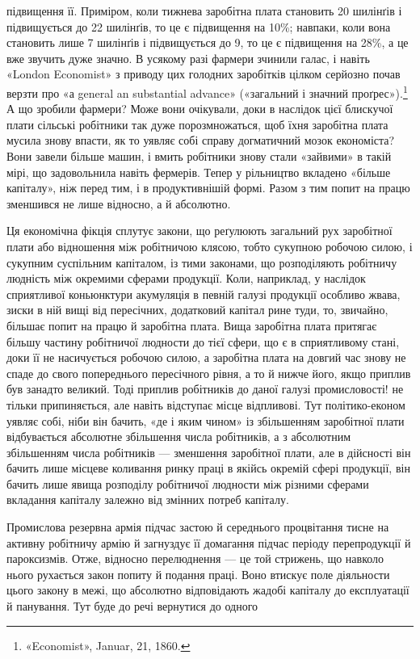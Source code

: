 \parcont{}  %
підвищення її. Приміром, коли тижнева заробітна плата становить
20 шилінґів і підвищується до 22 шилінґів, то це є підвищення
на 10\%; навпаки, коли вона становить лише 7 шилінґів
і підвищується до 9, то це є підвищення на 28\%, а це вже
звучить дуже значно. В усякому разі фармери зчинили галас,
і навіть «London Economist» з приводу цих голодних заробітків
цілком серйозно почав верзти про «а general an substantial
advance» («загальний і значний проґрес»).\footnote{
«Economist», Januar, 21, 1860.
} А що зробили
фармери? Може вони очікували, доки в наслідок цієї блискучої
плати сільські робітники так дуже порозмножаться, щоб їхня
заробітна плата мусила знову впасти, як то уявляє собі справу
догматичний мозок економіста? Вони завели більше машин,
і вмить робітники знову стали «зайвими» в такій мірі, що задовольнила
навіть фермерів. Тепер у рільництво вкладено
«більше капіталу», ніж перед тим, і в продуктивнішій формі.
Разом з тим попит на працю зменшився не лише відносно,
а й абсолютно.

Ця економічна фікція сплутує закони, що реґулюють загальний
рух заробітної плати або відношення між робітничою клясою,
тобто сукупною робочою силою, і сукупним суспільним капіталом,
із тими законами, що розподіляють робітничу людність
між окремими сферами продукції. Коли, наприклад, у наслідок
сприятливої коньюнктури акумуляція в певній галузі продукції
особливо жвава, зиски в ній вищі від пересічних, додатковий
капітал рине туди, то, звичайно, більшає попит на працю й заробітна
плата. Вища заробітна плата притягає більшу частину
робітничої людности до тієї сфери, що є в сприятливому стані,
доки її не насичується робочою силою, а заробітна плата на довгий
час знову не спаде до свого попереднього пересічного рівня,
а то й нижче його, якщо приплив був занадто великий. Тоді
приплив робітників до даної галузі промисловості! не тільки
припиняється, але навіть відступає місце відпливові. Тут політико-економ
уявляє собі, ніби він бачить, «де і яким чином»
із збільшенням заробітної плати відбувається абсолютне збільшення
числа робітників, а з абсолютним збільшенням числа робітників
— зменшення заробітної плати, але в дійсності він бачить
лише місцеве коливання ринку праці в якійсь окремій сфері
продукції, він бачить лише явища розподілу робітничої людности
між різними сферами вкладання капіталу залежно від змінних
потреб капіталу.

Промислова резервна армія підчас застою й середнього процвітання
тисне на активну робітничу армію й загнуздує її домагання
підчас періоду перепродукції й пароксизмів. Отже, відносно
перелюднення — це той стрижень, що навколо нього рухається
закон попиту й подання праці. Воно втискує поле діяльности
цього закону в межі, що абсолютно відповідають жадобі капіталу
до експлуатації й панування. Тут буде до речі вернутися до одного
\parbreak{}  %
